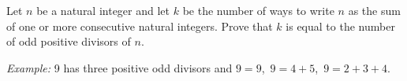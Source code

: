 Let $n$ be a natural integer and let $k$ be the number of ways to write $n$ as
the sum of one or more consecutive natural integers.
Prove that $k$ is equal to the number of odd positive divisors of $n$.

\emph{Example:} 9 has three positive odd divisors and $9=9$,\, $9=4+5$,\, $9=2+3+4$.
